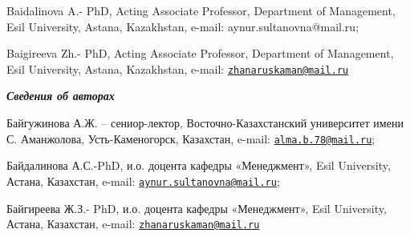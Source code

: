 Baidalinova A.- PhD, Acting Associate Professor, Department of
Management, Esil University, Astana, Kazakhstan, e-mail:
aynur.sultanovna@mail.ru;

Baigireeva Zh.- PhD, Acting Associate Professor, Department of
Management, Esil University, Astana, Kazakhstan, e-mail:
\href{mailto:zhanaruskaman@mail.ru}{\nolinkurl{zhanaruskaman@mail.ru}}

\emph{{\bfseries Сведения об авторах}}

Байгужинова А.Ж. -- сениор-лектор, Восточно-Казахстанский университет
имени С. Аманжолова, Усть-Каменогорск, Казахстан, e-mail:
\href{mailto:alma.b.78@mail.ru}{\nolinkurl{alma.b.78@mail.ru}};

Байдалинова А.С.-PhD, и.о. доцента кафедры «Менеджмент», Esil
University, Астана, Казахстан, e-mail:
\href{mailto:aynur.sultanovna@mail.ru}{\nolinkurl{aynur.sultanovna@mail.ru}};

Байгиреева Ж.З.- PhD, и.о. доцента кафедры «Менеджмент», Esil
University, Астана, Казахстан, e-mail:
\href{mailto:zhanaruskaman@mail.ru}{\nolinkurl{zhanaruskaman@mail.ru}}\